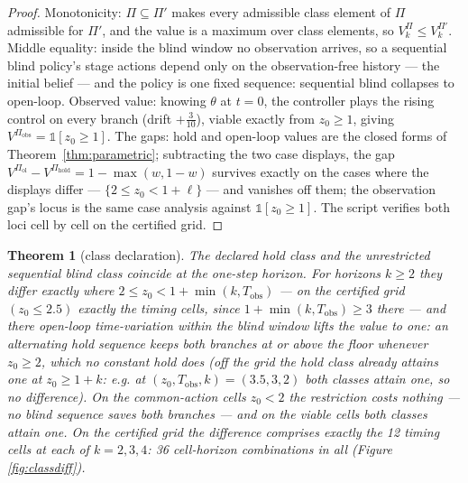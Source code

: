 \documentclass[10pt,twocolumn]{article}
\theoremstyle{plain}
\newtheorem{theorem}{Theorem}
\theoremstyle{definition}
\theoremstyle{remark}
\begin{document}
\begin{proof}
Monotonicity: \(\Pi \subseteq \Pi'\) makes every admissible class
element of \(\Pi\) admissible for \(\Pi'\), and the value is a
maximum over class elements, so
\(V^{\Pi}_{k} \le V^{\Pi'}_{k}\). Middle equality: inside the blind
window no observation arrives, so a sequential blind policy's stage
actions depend only on the observation-free history --- the initial
belief --- and the policy is one fixed sequence: sequential blind
collapses to open-loop. Observed value: knowing \(\theta\) at
\(t = 0\), the controller plays the rising control on every branch
(drift \(+\tfrac3{10}\)), viable exactly from \(z_{0} \ge 1\),
giving \(V^{\Pi_{\mathrm{obs}}} = \mathbb{1}[z_{0} \ge 1]\). The
gaps: hold and open-loop values are the closed forms of
Theorem~\ref{thm:parametric}; subtracting the two case displays, the gap
\(V^{\Pi_{\mathrm{ol}}} - V^{\Pi_{\mathrm{hold}}} = 1 - \max(w,
1 - w)\) survives exactly on the cases where the displays differ ---
\(\{2 \le z_{0} < 1 + \ell\}\) --- and vanishes off them; the
observation gap's locus is the same case analysis against
\(\mathbb{1}[z_{0} \ge 1]\). The script verifies both loci cell by
cell on the certified grid.
\end{proof}

\begin{theorem}[class declaration]\label{thm:class}
The declared hold class and the unrestricted sequential blind class
coincide at the one-step horizon. For horizons \(k \ge 2\) they differ
exactly where \(2 \le z_{0} < 1 + \min(k, T_{\mathrm{obs}})\) --- on
the certified grid \((z_{0} \le 2.5)\) exactly the timing cells, since
\(1 + \min(k, T_{\mathrm{obs}}) \ge 3\) there --- and there open-loop
time-variation within the blind window lifts the value to one: an
alternating hold sequence keeps both branches at or above the floor
whenever \(z_{0} \ge 2\), which no constant hold does (off the grid
the hold class already attains one at \(z_{0} \ge 1 + k\): e.g. at
\((z_{0}, T_{\mathrm{obs}}, k) = (3.5, 3, 2)\) both classes attain
one, so no difference). On the
common-action cells \(z_{0} < 2\) the restriction costs nothing --- no
blind sequence saves both branches --- and on the viable cells both
classes attain one. On the certified grid the difference comprises exactly
the 12 timing cells at each of \(k = 2, 3, 4\): 36 cell-horizon
combinations in all (Figure \ref{fig:classdiff}).
\end{theorem}
\end{document}
